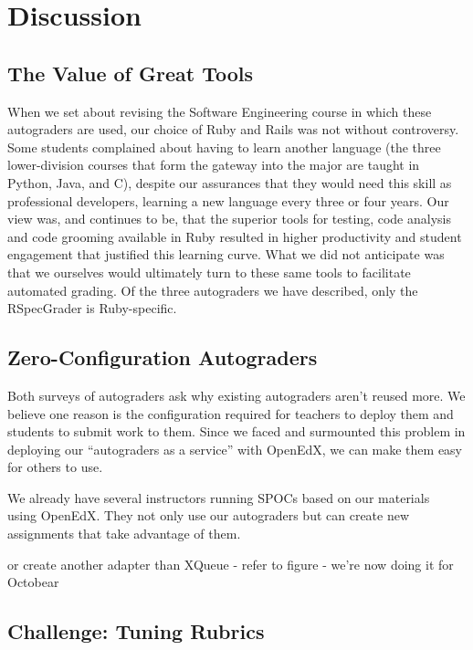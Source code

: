 \section{Discussion}


\subsection{The Value of Great Tools}


When we set about revising the Software Engineering course in which
these autograders are used, our choice of Ruby and Rails was not without
controversy.  Some students complained about having to learn another
language (the three lower-division courses that form the gateway into
the major are taught in Python, Java, and C), despite our assurances
that they would need this skill  as professional developers, learning a
new language every three or four years.  Our view was, and continues to
be, that the superior tools for testing, code analysis and code grooming
available in Ruby resulted in higher productivity and student engagement
that justified this learning curve.  What we did not anticipate was that
we ourselves would ultimately turn to these same tools to facilitate
automated grading.  Of the three autograders we have described, only the
RSpecGrader is Ruby-specific.

\subsection{Zero-Configuration Autograders}

Both  surveys of autograders ask why existing autograders aren't reused more.
We believe one reason is the configuration required for teachers to deploy them and
students to submit work to them.  Since we
faced and surmounted this problem in deploying our ``autograders as a
service'' with OpenEdX, we can make them easy for others to use.

We already have several instructors running SPOCs based on our
materials~\cite{moocs-spocs-TR} using OpenEdX.  They not only use our
autograders but can create new assignments that take advantage of them.

or create another adapter than XQueue - refer to figure - we're now
doing it for Octobear

\subsection{Challenge: Tuning Rubrics}

